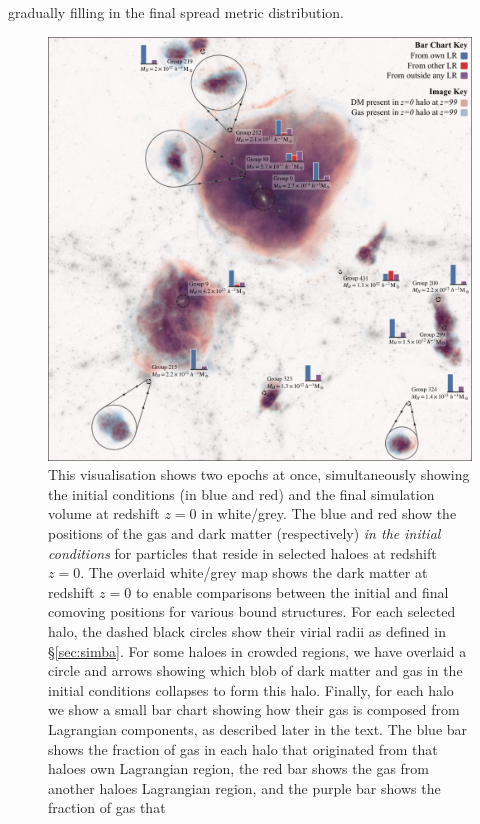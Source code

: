\documentclass[fleqn,usenatbib]{mnras}
\begin{document}
gradually filling in the final spread metric distribution. \begin{figure}
	\centering
	\vspace{0.5cm}
	\includegraphics{figures/fancy-figure-updated.pdf}
 \caption{ This visualisation shows two epochs at once, simultaneously
 showing the initial conditions (in blue and red) and the final simulation
 volume at redshift $z=0$ in white/grey. The blue and red show the positions
 of the gas and dark matter (respectively) \emph{in the initial conditions}
 for particles that reside in selected haloes at redshift $z=0$. The overlaid
 white/grey map shows the dark matter at redshift $z=0$ to enable comparisons
 between the initial and final comoving positions for various bound
 structures. For each selected halo, the dashed black circles show their
 virial radii as defined in \S \ref{sec:simba}. For some haloes in crowded
 regions, we have overlaid a circle and arrows showing which blob of dark
 matter and gas in the initial conditions collapses to form this halo.
 Finally, for each halo we show a small bar chart showing how their gas is
 composed from Lagrangian components, as described later in the text. The
 blue bar shows the fraction of gas in each halo that originated from that
 haloes own Lagrangian region, the red bar shows the gas from another haloes
 Lagrangian region, and the purple bar shows the fraction of gas that
}
\end{figure}
\end{document}
